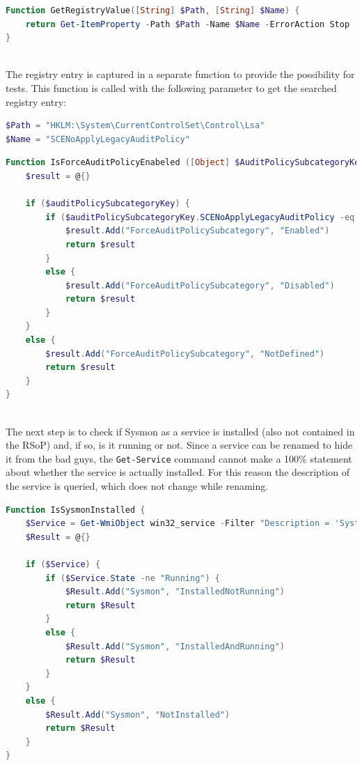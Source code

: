 \begin{lstlisting}[caption=GetRegistryValue,language=PowerShell]
Function GetRegistryValue([String] $Path, [String] $Name) {
    return Get-ItemProperty -Path $Path -Name $Name -ErrorAction Stop
}
\end{lstlisting} \ \\
The registry entry is captured in a separate function to provide the possibility for tests. This function is called with the following parameter \cite{ForceAudit} to get the searched registry entry:

\begin{lstlisting}[language=PowerShell]
$Path = "HKLM:\System\CurrentControlSet\Control\Lsa"
$Name = "SCENoApplyLegacyAuditPolicy"
\end{lstlisting}


\begin{lstlisting}[caption=Function IsForceAuditPolicyEnabeled, language=PowerShell]
Function IsForceAuditPolicyEnabeled ([Object] $AuditPolicySubcategoryKey) {
    $result = @{}

    if ($auditPolicySubcategoryKey) {
        if ($auditPolicySubcategoryKey.SCENoApplyLegacyAuditPolicy -eq 1) {
            $result.Add("ForceAuditPolicySubcategory", "Enabled")
            return $result
        }
        else {
            $result.Add("ForceAuditPolicySubcategory", "Disabled")
            return $result
        }
    }
    else {
        $result.Add("ForceAuditPolicySubcategory", "NotDefined")
        return $result
    }
}
\end{lstlisting}\ \\
The next step is to check if Sysmon as a service is installed (also not contained in the RSoP) and, if so, is it running or not. Since a service can be renamed to hide it from the bad guys, the \lstinline|Get-Service| command cannot make a 100\% statement about whether the service is actually installed. For this reason the description of the service is queried, which does not change while renaming. \cite{Sysmon1}
\begin{lstlisting}[caption=Function IsSysmonInstalled, language=PowerShell]
Function IsSysmonInstalled {
    $Service = Get-WmiObject win32_service -Filter "Description = 'System Monitor service'"
    $Result = @{}

    if ($Service) {
        if ($Service.State -ne "Running") {
            $Result.Add("Sysmon", "InstalledNotRunning")
            return $Result
        }
        else {
            $Result.Add("Sysmon", "InstalledAndRunning")
            return $Result
        }
    }
    else {
        $Result.Add("Sysmon", "NotInstalled")
        return $Result
    }
}
\end{lstlisting}

